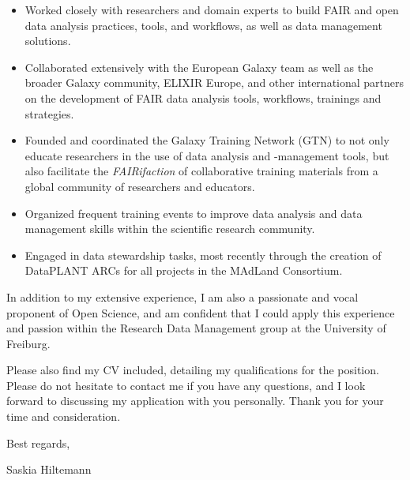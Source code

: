 \documentclass[]{shiltemann-cv}
\begin{document}
\begin{itemize}
\item Worked closely with researchers and domain experts to build FAIR and open data analysis practices, tools, and workflows, as well as data management solutions.
\item Collaborated extensively with the European Galaxy team as well as the broader Galaxy community, ELIXIR Europe, and other international partners on the development of FAIR data analysis tools, workflows, trainings and strategies.
\item Founded and coordinated the Galaxy Training Network (GTN) to not only educate researchers in the use of data analysis and -management tools, but also facilitate the \emph{FAIRifaction} of collaborative training materials from a global community of researchers and educators.
\item Organized frequent training events to improve data analysis and data management skills within the scientific research community.
\item Engaged in data stewardship tasks, most recently through the creation of DataPLANT ARCs for all projects in the MAdLand Consortium.
\end{itemize}

In addition to my extensive experience, I am also a passionate and vocal proponent of Open Science, and am confident that I could apply this experience and passion within the Research Data Management group at the University of Freiburg.

Please also find my CV included, detailing my qualifications for the position. Please do not hesitate to contact me if you have any questions, and I look forward to discussing my application with
you personally. Thank you for your time and consideration.

Best regards,

Saskia Hiltemann
\end{document}
